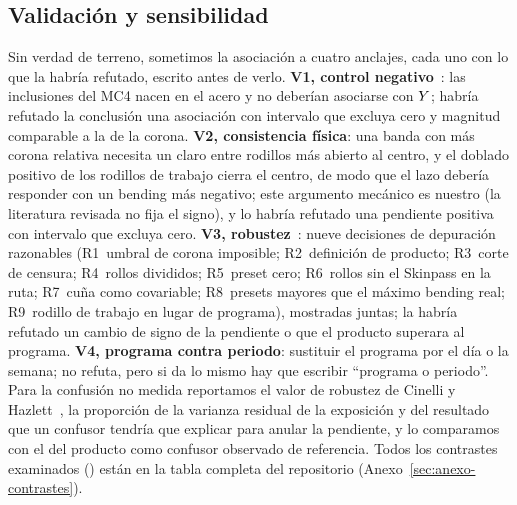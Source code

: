 \subsection{Validación y sensibilidad}
\label{sec:validacion}
Sin verdad de terreno, sometimos la asociación a cuatro anclajes, cada uno con lo que la habría refutado, escrito antes
de verlo. \textbf{V1, control negativo}~\cite{lipsitch2010}: las inclusiones del MC4 nacen en el acero y no deberían
asociarse con $Y$; habría refutado la conclusión una asociación con intervalo que excluya cero y magnitud comparable a
la de la corona. \textbf{V2, consistencia física}: una banda con más corona relativa necesita un claro entre rodillos
más abierto al centro, y el doblado positivo de los rodillos de trabajo cierra el centro, de modo que el lazo debería
responder con un bending más negativo; este argumento mecánico es nuestro (la literatura revisada no fija el signo), y
lo habría refutado una pendiente positiva con intervalo que excluya cero. \textbf{V3, robustez}~\cite{steegen2016}:
nueve decisiones de depuración razonables (R1~umbral de corona imposible; R2~definición de producto; R3~corte de
censura; R4~rollos divididos; R5~preset cero; R6~rollos sin el Skinpass en la ruta; R7~cuña como covariable; R8~presets
mayores que el máximo bending real; R9~rodillo de trabajo en lugar de programa), mostradas juntas; la habría refutado un
cambio de signo de la pendiente o que el producto superara al programa. \textbf{V4, programa contra periodo}: sustituir
el programa por el día o la semana; no refuta, pero si da lo mismo hay que escribir ``programa o periodo''. Para la
confusión no medida reportamos el valor de robustez de Cinelli y Hazlett~\cite{cinelli2020}, la proporción de la
varianza residual de la exposición y del resultado que un confusor tendría que explicar para anular la pendiente, y lo
comparamos con el del producto como confusor observado de referencia. Todos los contrastes examinados (\NContrastes)
están en la tabla completa del repositorio (Anexo~\ref{sec:anexo-contrastes}).
